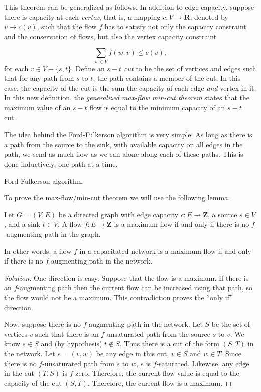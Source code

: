 \begin{remark}
\label{remark:GMCMF}
{\rm
This theorem can be generalized as follows.
In addition to edge capacity, suppose there is capacity at each {\it vertex},
that is, a mapping $c: V \to {\mathbf{R}}$, denoted by
$v \mapsto c(v)$, such that the flow $f$ has to
satisfy not only the capacity constraint and the conservation of flows,
but also the vertex capacity constraint

\[
 \sum_{w\in V} f(w,v) \leq c(v),
\]
for each $v \in V-\{s,t\}$.
Define an {\it $s-t$ cut} to be the set of vertices and edges such
that for any path from $s$ to $t$, the path contains a member of the cut.
In this case, the capacity of the cut is the sum the capacity of each
edge {\it and} vertex in it.
In this new definition, the {\it generalized max-flow min-cut theorem}
states that the maximum value of an $s-t$ flow is equal to the minimum
capacity of an $s-t$ cut..
}
\end{remark}

The idea behind the Ford-Fulkerson algorithm is very simple: As long as
there is a path from the source to the sink, with
available capacity on all edges in the
path, we send as much flow as we can alone along each
of these paths. This is done inductively, one path at a time.

\begin{algorithm}[!htbp]

\caption{Ford-Fulkerson algorithm.}
\label{alg:distance-connectivity:ford-fulkerson}
\end{algorithm}

To prove the max-flow/min-cut theorem we will use the following lemma.

\begin{lemma}
{\rm
Let $G=(V,E)$ be a directed graph with edge
capacity $c: E \to {\mathbf{Z}}$,
a source $s\in V$, and a sink $t\in V$.
A flow $f: E \to {\mathbf{Z}}$ is a maximum flow if
and only if there is no $f$-augmenting path in the graph.
}
\end{lemma}

In other words, a flow $f$ in a
capacitated network is a maximum flow if and only if
there is no $f$-augmenting path in the network.

\begin{proof}[Solution]
One direction is easy. Suppose that the flow is a maximum.
If there is an $f$-augmenting path then the
current flow can be increased using that path, so the flow would not
be a maximum. This contradiction proves the ``only if'' direction.

Now, suppose there is no $f$-augmenting path in the network.
Let $S$ be the set of vertices $v$ such that there is an $f$-unsaturated path from
the source $s$ to $v$. We know $s\in S$ and (by hypothesis)
$t\notin S$. Thus there is a cut of the form $(S,T)$ in the network.
Let $e=(v,w)$ be any edge in this cut, $v\in S$ and $w\in T$. Since
there is no $f$-unsaturated path from $s$ to $w$,
$e$ is $f$-saturated. Likewise, any edge in the cut
$(T,S)$ is $f$-zero. Therefore, the current flow value is equal to the
capacity of the cut $(S,T)$. Therefore, the current flow is a maximum.
\end{proof}

